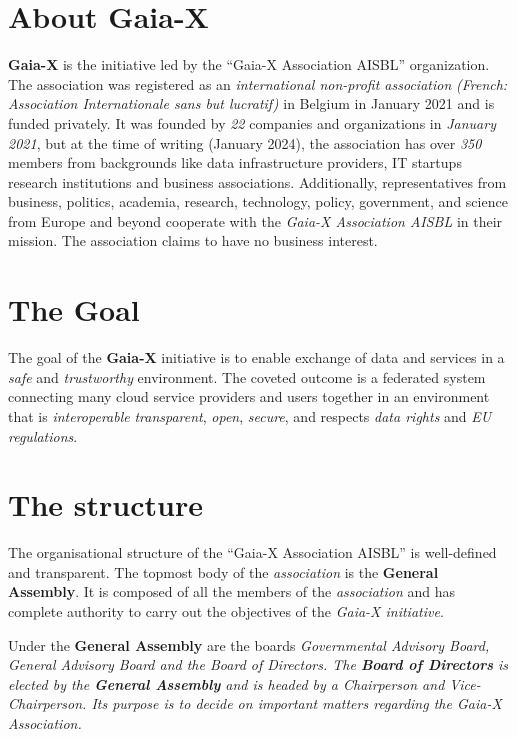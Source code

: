 \section{About Gaia-X}\label{sec:about-gaia-x}

\textbf{Gaia-X} is the initiative led by the ``Gaia-X Association AISBL'' organization.
The association was registered as an \textit{international non-profit association} \textit{(French: Association Internationale sans but lucratif)} in Belgium in January 2021 and is funded privately.
It was founded by \textit{22} companies and organizations in \textit{January 2021}, but at the time of writing (January 2024), the association has over \textit{350} members from backgrounds like data infrastructure providers, IT startups research institutions and business associations. %
Additionally, representatives from business, politics, academia, research, technology, policy, government, and science from Europe and beyond cooperate with the \textit{Gaia-X Association AISBL} in their mission.
The association claims to have no business interest\cite{gaiax}.

\section{The Goal}\label{sec:gaia-x-goal}

The goal of the \textbf{Gaia-X} initiative is to enable exchange of data and services in a \textit{safe} and \textit{trustworthy} environment\cite{gaiax}.
The coveted outcome is a federated system connecting many cloud service providers and users together in an environment that is \textit{interoperable} \textit{transparent}, \textit{open}, \textit{secure}, and respects \textit{data rights} and \textit{EU regulations}.

\section{The structure}\label{sec:the-structure}

The organisational structure of the ``Gaia-X Association AISBL'' is well-defined and transparent\cite{gaiax}.
The topmost body of the \textit{association} is the \textbf{General Assembly}.
It is composed of all the members of the \textit{association} and has complete authority to carry out the objectives of the \textit{Gaia-X initiative}.

Under the \textbf{General Assembly} are the boards \em \textit{Governmental Advisory Board}, \textit{General Advisory Board} and the \textit{Board of Directors}.
The \textbf{Board of Directors} is elected by the \textbf{General Assembly} and is headed by a Chairperson and Vice-Chairperson.
Its purpose is to decide on important matters regarding the \textit{Gaia-X Association}.

